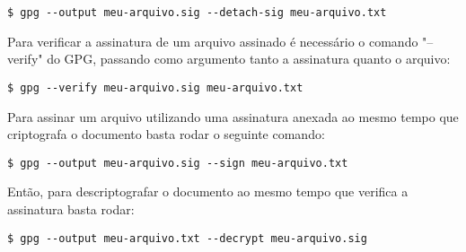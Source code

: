 \documentclass[a4paper,11pt]{article}
\theoremstyle{mytheor}
\begin{document}
\begin{lstlisting}
$ gpg --output meu-arquivo.sig --detach-sig meu-arquivo.txt
\end{lstlisting}

Para verificar a assinatura de um arquivo assinado é necessário o comando "--verify" do GPG, passando como argumento tanto a assinatura quanto o arquivo:
\begin{lstlisting}
$ gpg --verify meu-arquivo.sig meu-arquivo.txt
\end{lstlisting}

Para assinar um arquivo utilizando uma assinatura anexada ao mesmo tempo que criptografa o documento basta rodar o seguinte comando:
\begin{lstlisting}
$ gpg --output meu-arquivo.sig --sign meu-arquivo.txt
\end{lstlisting}

Então, para descriptografar o documento ao mesmo tempo que verifica a assinatura basta rodar:
\begin{lstlisting}
$ gpg --output meu-arquivo.txt --decrypt meu-arquivo.sig
\end{lstlisting}
\end{document}
